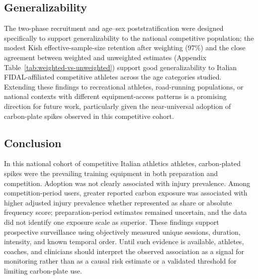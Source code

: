 \subsection{Generalizability}
\label{sec:discussion-generalizability}
The two-phase recruitment and age--sex poststratification were designed specifically to support generalizability to the national competitive population; the modest Kish effective-sample-size retention after weighting (97\%) and the close agreement between weighted and unweighted estimates (Appendix Table~\ref{tab:weighted-vs-unweighted}) support good generalizability to Italian FIDAL-affiliated competitive athletes across the age categories studied. Extending these findings to recreational athletes, road-running populations, or national contexts with different equipment-access patterns is a promising direction for future work, particularly given the near-universal adoption of carbon-plate spikes observed in this competitive cohort.

\subsection{Conclusion}
\label{sec:discussion-conclusion}
In this national cohort of competitive Italian athletics athletes, carbon-plated spikes were the prevailing training equipment in both preparation and competition. Adoption was not clearly associated with injury prevalence. Among competition-period users, greater reported carbon exposure was associated with higher adjusted injury prevalence whether represented as share or absolute frequency score; preparation-period estimates remained uncertain, and the data did not identify one exposure scale as superior. These findings support prospective surveillance using objectively measured unique sessions, duration, intensity, and known temporal order. Until such evidence is available, athletes, coaches, and clinicians should interpret the observed association as a signal for monitoring rather than as a causal risk estimate or a validated threshold for limiting carbon-plate use.

